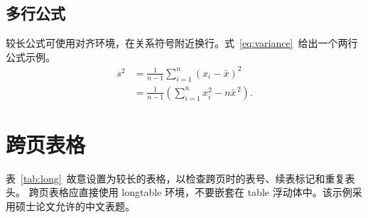 \subsection{多行公式}
较长公式可使用对齐环境，在关系符号附近换行。式~\eqref{eq:variance}~给出一个两行公式示例。
\begin{equation}
  \begin{aligned}
    s^2 &= \frac{1}{n-1}\sum_{i=1}^{n}(x_i-\bar{x})^2 \\
        &= \frac{1}{n-1}\left(\sum_{i=1}^{n}x_i^2-n\bar{x}^{\,2}\right).
  \end{aligned}
  \label{eq:variance}
\end{equation}

\section{跨页表格}
表~\ref{tab:long}~故意设置为较长的表格，以检查跨页时的表号、续表标记和重复表头。
跨页表格应直接使用 longtable 环境，不要嵌套在 table 浮动体中。该示例采用硕士论文允许的中文表题。
